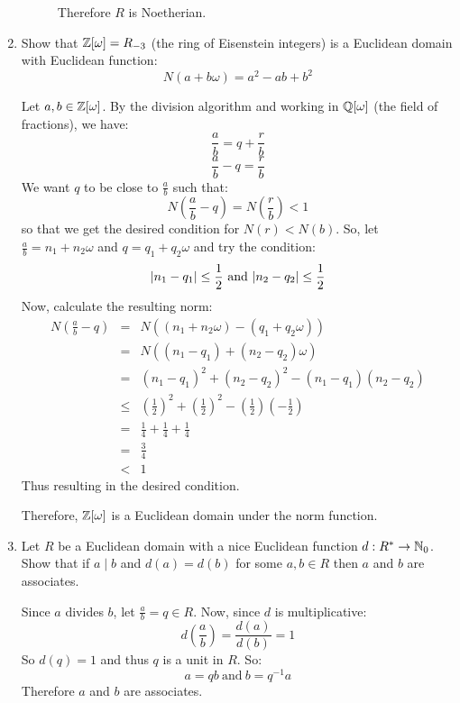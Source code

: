 \documentclass[letterpaper,12pt,fleqn]{article}
\newcommand{\w}{\omega}
\begin{document}
\begin{enumerate}
\begin{description}
    Therefore $R$ is Noetherian.
  \end{description}
\newpage
\item Show that $\Z[\w]=R_{-3}$ (the ring of Eisenstein integers) is a
  Euclidean domain with Euclidean function:
  \[N(a+b\w)=a^2-ab+b^2\]

  Let $a,b\in\Z[\w]$. By the division algorithm and working in $\Q[\w]$ (the
  field of fractions), we have:
  \[\frac{a}{b}=q+\frac{r}{b}\]
  \[\frac{a}{b}-q=\frac{r}{b}\]
  We want $q$ to be close to $\frac{a}{b}$ such that:
  \[N(\frac{a}{b}-q)=N(\frac{r}{b})<1\]
  so that we get the desired condition for $N(r)<N(b)$. So, let
  $\frac{a}{b}=n_1+n_2\w$ and $q=q_1+q_2\w$ and try the condition:
  \[\abs{n_1-q_1}\le\frac{1}{2}\ \mbox{and}\ \abs{n_2-q_2}\le\frac{1}{2}\]
  Now, calculate the resulting norm:
  \begin{eqnarray*}
    N(\frac{a}{b}-q) &=& N((n_1+n_2\w)-(q_1+q_2\w)) \\
    &=& N((n_1-q_1)+(n_2-q_2)\w) \\
    &=& (n_1-q_1)^2+(n_2-q_2)^2-(n_1-q_1)(n_2-q_2) \\
    &\le& \left(\frac{1}{2}\right)^2+\left(\frac{1}{2}\right)^2-
    \left(\frac{1}{2}\right)\left(-\frac{1}{2}\right) \\
    &=& \frac{1}{4}+\frac{1}{4}+\frac{1}{4} \\
    &=& \frac{3}{4} \\
    &<& 1
  \end{eqnarray*}
  Thus resulting in the desired condition.

  Therefore, $\Z[\w]$ is a Euclidean domain under the norm function.
\newpage
\item Let $R$ be a Euclidean domain with a nice Euclidean function
  $d:R^*\to\mathbb{N}_0$. Show that if $a\mid b$ and $d(a)=d(b)$ for some $a,b\in R$
  then $a$ and $b$ are associates.

  Since $a$ divides $b$, let $\frac{a}{b}=q\in R$. Now, since $d$ is
  multiplicative:
  \[d\left(\frac{a}{b}\right)=\frac{d(a)}{d(b)}=1\]
  So $d(q)=1$ and thus $q$ is a unit in $R$. So:
  \[a=qb\ \mbox{and}\ b=q^{-1}a\]
  Therefore $a$ and $b$ are associates.
\end{enumerate}
\end{document}
